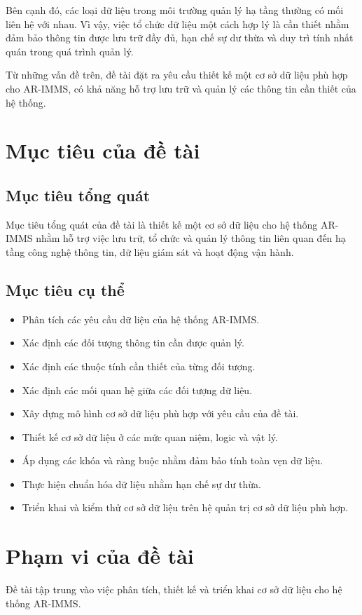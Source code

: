 Bên cạnh đó, các loại dữ liệu trong môi trường quản lý hạ tầng thường có mối liên hệ với nhau. Vì vậy, việc tổ chức dữ liệu một cách hợp lý là cần thiết nhằm đảm bảo thông tin được lưu trữ đầy đủ, hạn chế sự dư thừa và duy trì tính nhất quán trong quá trình quản lý.

Từ những vấn đề trên, đề tài đặt ra yêu cầu thiết kế một cơ sở dữ liệu phù hợp cho AR-IMMS, có khả năng hỗ trợ lưu trữ và quản lý các thông tin cần thiết của hệ thống.

\section{Mục tiêu của đề tài}

\subsection{Mục tiêu tổng quát}
Mục tiêu tổng quát của đề tài là thiết kế một cơ sở dữ liệu cho hệ thống AR-IMMS nhằm hỗ trợ việc lưu trữ, tổ chức và quản lý thông tin liên quan đến hạ tầng công nghệ thông tin, dữ liệu giám sát và hoạt động vận hành.

\subsection{Mục tiêu cụ thể}
\begin{itemize}[leftmargin=*]
    \item Phân tích các yêu cầu dữ liệu của hệ thống AR-IMMS.
    \item Xác định các đối tượng thông tin cần được quản lý.
    \item Xác định các thuộc tính cần thiết của từng đối tượng.
    \item Xác định các mối quan hệ giữa các đối tượng dữ liệu.
    \item Xây dựng mô hình cơ sở dữ liệu phù hợp với yêu cầu của đề tài.
    \item Thiết kế cơ sở dữ liệu ở các mức quan niệm, logic và vật lý.
    \item Áp dụng các khóa và ràng buộc nhằm đảm bảo tính toàn vẹn dữ liệu.
    \item Thực hiện chuẩn hóa dữ liệu nhằm hạn chế sự dư thừa.
    \item Triển khai và kiểm thử cơ sở dữ liệu trên hệ quản trị cơ sở dữ liệu phù hợp.
\end{itemize}

\section{Phạm vi của đề tài}
Đề tài tập trung vào việc phân tích, thiết kế và triển khai cơ sở dữ liệu cho hệ thống AR-IMMS.

